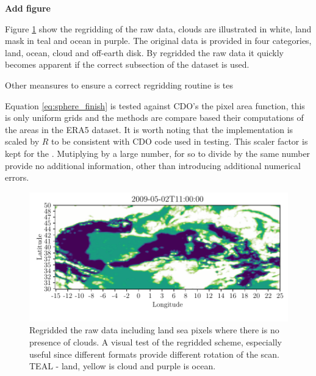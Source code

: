 \textbf{Add figure} 

Figure \ref{fig:visual_inspection_regridding} show the regridding of the raw data, clouds are illustrated in white, land mask in teal and ocean in purple. 
The original data is provided in four categories, land, ocean, cloud and off-earth disk. By regridded the raw data it quickly becomes apparent if the correct subsection of the dataset is used. 

Other meansures to ensure a correct regridding routine is tes

Equation \ref{eq:sphere_finish} is tested against CDO's the pixel area function, this is only uniform grids and the methods are compare based their computations of the areas in the ERA5 dataset. It is worth noting that the implementation is scaled by $R$ to be consistent with CDO code used in testing. This scaler factor is kept for the . Mutiplying by a large number, for so to divide by the same number provide no additional information, other than introducing additional numerical errors. 

\begin{figure}
    \centering
    \includegraphics{python_figs/visual_regridding.pdf}
    \caption{Regridded the raw data including land sea pixels where there is no presence of clouds. A visual test of the regridded scheme, especially useful since different formats provide different rotation of the scan. TEAL - land, yellow is cloud and purple is ocean.}
    \label{fig:visual_inspection_regridding}
\end{figure}

